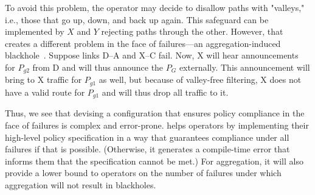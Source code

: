 To avoid this problem, the operator may decide to disallow paths with "valleys," i.e., those that go up, down, and back up again. This safeguard can be implemented by $X$ and $Y$ rejecting paths through the other. However, that creates a different problem in the face of failures---an aggregation-induced blackhole~\cite{xx}. Suppose links D--A and X--C fail. Now, X will hear announcements for $P_{g2}$ from D and will thus announce the $P_G$ externally. This announcement will bring to X traffic for $P_{g1}$ as well, but because of valley-free filtering, X does not have a valid route for $P_{g1}$ and will thus drop all traffic to it.

Thus, we see that devising a configuration that ensures policy compliance in the face of failures is complex and error-prone. \sysname helps operators by implementing their high-level policy specification in a way that guarantees compliance under all failures if that is possible. (Otherwise, it generates a compile-time error that informs them that the specification cannot be met.) For aggregation, it will also provide a lower bound to operators on the number of failures under which aggregation will not result in blackholes.



